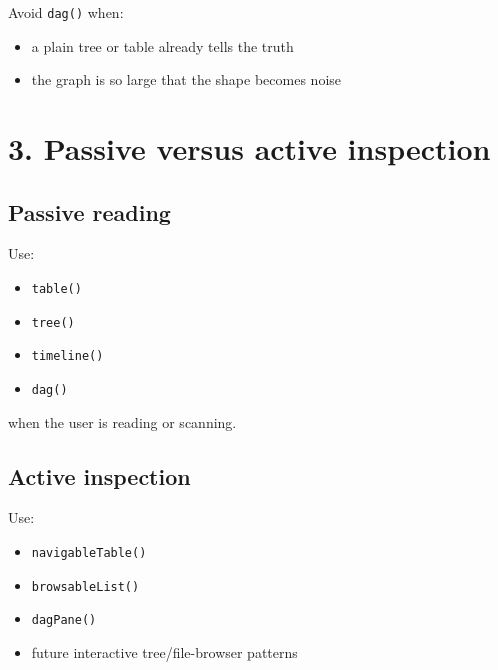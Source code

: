 Avoid \texttt{d\allowbreak{}a\allowbreak{}g\allowbreak{}(\allowbreak{})} when:

\begin{itemize}
\tightlist
\item
  a plain tree or table already tells the truth
\item
  the graph is so large that the shape becomes noise
\end{itemize}

\section{3. Passive versus active inspection}\label{record-020-passive-versus-active-inspection}

\subsection{Passive reading}\label{record-020-passive-reading}

Use:

\begin{itemize}
\tightlist
\item
  \texttt{t\allowbreak{}a\allowbreak{}b\allowbreak{}l\allowbreak{}e\allowbreak{}(\allowbreak{})}
\item
  \texttt{t\allowbreak{}r\allowbreak{}e\allowbreak{}e\allowbreak{}(\allowbreak{})}
\item
  \texttt{t\allowbreak{}i\allowbreak{}m\allowbreak{}e\allowbreak{}l\allowbreak{}i\allowbreak{}n\allowbreak{}e\allowbreak{}(\allowbreak{})}
\item
  \texttt{d\allowbreak{}a\allowbreak{}g\allowbreak{}(\allowbreak{})}
\end{itemize}

when the user is reading or scanning.

\subsection{Active inspection}\label{record-020-active-inspection}

Use:

\begin{itemize}
\tightlist
\item
  \texttt{n\allowbreak{}a\allowbreak{}v\allowbreak{}i\allowbreak{}g\allowbreak{}a\allowbreak{}b\allowbreak{}l\allowbreak{}e\allowbreak{}T\allowbreak{}a\allowbreak{}b\allowbreak{}l\allowbreak{}e\allowbreak{}(\allowbreak{})}
\item
  \texttt{b\allowbreak{}r\allowbreak{}o\allowbreak{}w\allowbreak{}s\allowbreak{}a\allowbreak{}b\allowbreak{}l\allowbreak{}e\allowbreak{}L\allowbreak{}i\allowbreak{}s\allowbreak{}t\allowbreak{}(\allowbreak{})}
\item
  \texttt{d\allowbreak{}a\allowbreak{}g\allowbreak{}P\allowbreak{}a\allowbreak{}n\allowbreak{}e\allowbreak{}(\allowbreak{})}
\item
  future interactive tree/file-browser patterns
\end{itemize}

